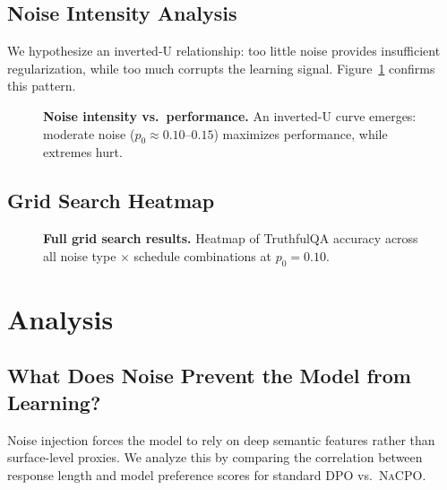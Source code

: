 \documentclass{article}
\newcommand{\nacpo}{\textsc{NaCPO}}
\begin{document}
\subsection{Noise Intensity Analysis}


We hypothesize an inverted-U relationship: too little noise provides insufficient regularization, while too much corrupts the learning signal.
Figure~\ref{fig:inverted_u} confirms this pattern.

\begin{figure}[t]
\centering
{}
\caption{\textbf{Noise intensity vs.\ performance.} An inverted-U curve emerges: moderate noise ($p_0 \approx 0.10$--$0.15$) maximizes performance, while extremes hurt.}
\label{fig:inverted_u}
\end{figure}


\subsection{Grid Search Heatmap}

\begin{figure}[t]
\centering
{}
\caption{\textbf{Full grid search results.} Heatmap of TruthfulQA accuracy across all noise type $\times$ schedule combinations at $p_0{=}0.10$.}
\label{fig:heatmap}
\end{figure}


\section{Analysis}
\label{sec:analysis}

\subsection{What Does Noise Prevent the Model from Learning?}

Noise injection forces the model to rely on deep semantic features rather than surface-level proxies.
We analyze this by comparing the correlation between response length and model preference scores for standard DPO vs.\ \nacpo{}.
\end{document}
